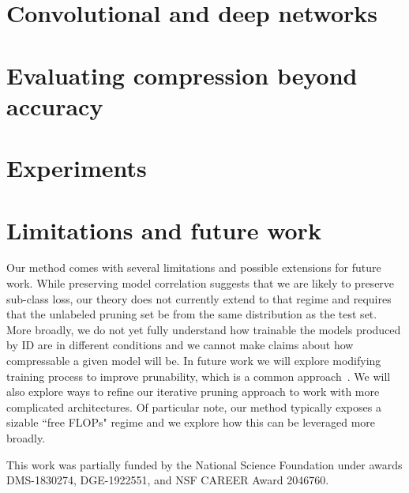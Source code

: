 \documentclass{article}
\begin{document}
\section{Convolutional and deep networks}
\label{sec:extendid}


%

\section{Evaluating compression beyond accuracy}
\label{sec:correlation}



\section{Experiments}
\label{sec:experiments}


\vspace{-2em}
\section{Limitations and future work}
\label{sec:dis}
Our method comes with several limitations and possible extensions for future work.  
While preserving model correlation suggests that we are likely to preserve sub-class loss, our theory does not currently extend to that regime and requires that the unlabeled pruning set be from the same distribution as the test set. More broadly, we do not yet fully understand how trainable the models produced by ID are in different conditions and we cannot make claims about how compressable a given model will be. In future work we will explore modifying training process to improve prunability, which is a common approach~\cite{huang2018sss,yang2020hoyer,liu2017netslim,zhuang2020polar}.  
We will also explore ways to refine our iterative pruning approach to work with
more complicated architectures. Of particular note, our method typically exposes a sizable ``free FLOPs" regime and we explore how this can be leveraged more broadly.


\vspace{-1em}
\begin{ack}
\vspace{-1em}
This work was partially funded by the National Science Foundation under awards
DMS-1830274, DGE-1922551, and NSF CAREER Award 2046760.
\end{ack}
\end{document}
